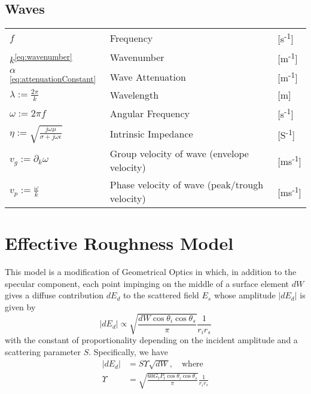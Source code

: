 \documentclass{article}
\numberwithin{equation}{section}
\begin{document}
        \subsection*{Waves}
            \begin{tabular}{ m{7em} m{24em} m{4em} }
                \( \displaystyle f \) & Frequency & [s\textsuperscript{-1}] \\
                \( \displaystyle k \)\textsuperscript{\eqref{eq:wavenumber}} &
                    Wavenumber & [m\textsuperscript{-1}]  \\
                \( \displaystyle \alpha \)\textsuperscript{\eqref{eq:attenuationConstant}}
                    & Wave Attenuation & [m\textsuperscript{-1}]  \\
                \( \displaystyle \lambda := \frac{2 \pi}{k} \) & Wavelength & [m] \\
                \( \displaystyle \omega := 2 \pi f \) & Angular Frequency &
                    [s\textsuperscript{-1}] \\
                \( \displaystyle \eta := \sqrt{\frac{j \omega \mu}{\sigma + j \omega
                    \epsilon}} \) &
                    Intrinsic Impedance & [S\textsuperscript{-1}] \\
                \( \displaystyle v_g := \partial_k \omega \) & Group velocity of wave
                    (envelope velocity) & [ms\textsuperscript{-1}]  \\
                \( \displaystyle v_p := \frac{\omega}{k} \) & Phase velocity of wave
                    (peak/trough velocity) & [ms\textsuperscript{-1}]  \\
            \end{tabular}
            \normalsize
    \newpage
    \section{Effective Roughness Model}
        This model is a modification of Geometrical Optics in which, in addition to the
        specular component, each point impinging on the middle of a surface element $dW$
        gives a diffuse contribution $dE_d$ to the scattered field $E_s$ whose amplitude $\left|
        dE_d \right|$ is given by
        \begin{equation} \label{eq:scatteringAmpER}
           \left| dE_d \right| \propto \sqrt{\frac{dW \cos \theta_i \cos \theta_s}{\pi}}
           \frac{1}{r_i r_s}
        \end{equation}
        with the constant of proportionality depending on the incident amplitude and a
        scattering parameter $S$. Specifically, we have
        \begin{subequations}
            \begin{align}
                \left| dE_d \right| &= S \Upsilon \sqrt{dW}, \quad \text{where} \\
                \Upsilon &= \sqrt{\frac{60 G_t P_t \cos \theta_i \cos \theta_s}{\pi}}
                \frac{1}{r_i r_s}
            \end{align}
        \end{subequations}
\end{document}
